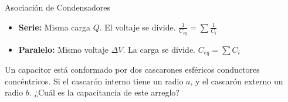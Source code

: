 \documentclass[11pt]{article}
\begin{document}
\begin{boxNota}{Asociación de Condensadores}
    \begin{itemize}
        \item \textbf{Serie:} Misma carga $Q$. El voltaje se divide. $\frac{1}{C_{eq}} = \sum \frac{1}{C_i}$
        \item \textbf{Paralelo:} Mismo voltaje $\Delta V$. La carga se divide. $C_{eq} = \sum C_i$
    \end{itemize}
\end{boxNota}

\noindent
\begin{minipage}[t]{0.6\textwidth}
    \problema Un capacitor está conformado por dos cascarones esféricos conductores concéntricos. Si el cascarón interno tiene un radio $a$, y el cascarón externo un radio $b$. ¿Cuál es la capacitancia de este arreglo?
\end{minipage}%
\hfill
\begin{minipage}[t]{0.4\textwidth}
    \begin{figure}[H]
        \centering
    \end{figure}
\end{minipage}
\end{document}
